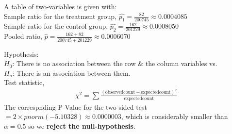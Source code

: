 \documentclass[boxes, qed]{homework}
\begin{document}
\begin{problem}
  A table of two-variables is given with:\\
  Sample ratio for the treatment group, $\hat{p_1}=\frac{82}{200745} \approx 0.0004085$\\
  Sample ratio for the control group, $\hat{p_2}=\frac{162}{201229} \approx 0.0008050$\\
  Pooled ratio, $\hat{p}=\frac{162+82}{200745+201229} \approx 0.0006070$
\end{problem}
\begin{solution}
  Hypothesis:\\
  $H_0$: There is no association between the row \& the column variables vs. \\
  $H_a$: There is an association between them. \\

  Test statistic, 
  \begin{align*}
    \chi^2=\sum{\frac{(\mathrm{observed count}-\mathrm{expected count})^2}{\mathrm{expected count}}}
  \end{align*}
  The correspnding P-Value for the two-sided test
  $=2\times pnorm(-5.10328) \approx 0.0000003$, 
  which is considerably smaller  than $\alpha=0.5$ so we \textbf{reject the null-hypothesis}.
\end{solution}
\end{document}
